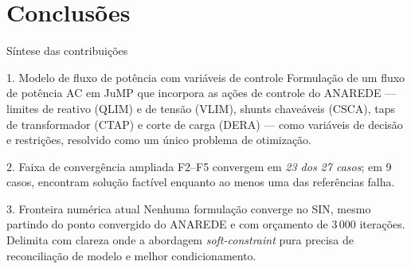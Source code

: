 \documentclass{libs/ufc_format}
\begin{document}
\section{Conclusões}

\begin{frame}{Síntese das contribuições}
    \begin{exampleblock}{1. Modelo de fluxo de potência com variáveis de controle}
        Formulação de um fluxo de potência AC em JuMP que incorpora as ações de controle do ANAREDE --- limites de reativo (QLIM) e de tensão (VLIM), shunts chaveáveis (CSCA), taps de transformador (CTAP) e corte de carga (DERA) --- como variáveis de decisão e restrições, resolvido como um único problema de otimização.
    \end{exampleblock}

    \begin{exampleblock}{2. Faixa de convergência ampliada}
        F2--F5 convergem em \emph{23 dos 27 casos}; em 9 casos, encontram solução factível enquanto ao menos uma das referências falha.
    \end{exampleblock}

    \begin{alertblock}{3. Fronteira numérica atual}
        Nenhuma formulação converge no SIN, mesmo partindo do ponto convergido do ANAREDE e com orçamento de 3\,000 iterações. Delimita com clareza onde a abordagem \textit{soft-constraint} pura precisa de reconciliação de modelo e melhor condicionamento.
    \end{alertblock}
\end{frame}
\end{document}
